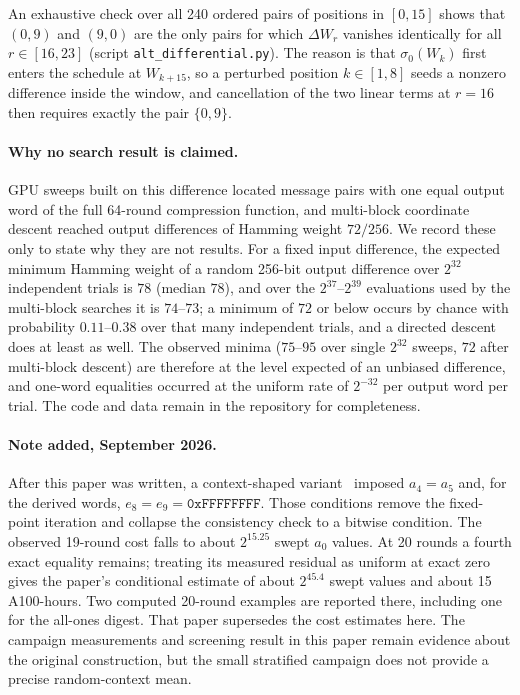 \documentclass[11pt,a4paper]{article}
\begin{document}
An exhaustive check over all 240 ordered pairs of positions in $[0,15]$
shows that $(0,9)$ and $(9,0)$ are the only pairs for which $\Delta W_r$
vanishes identically for all $r\in[16,23]$ (script
\texttt{alt\_differential.py}).  The reason is that $\sigma_0(W_k)$
first enters the schedule at $W_{k+15}$, so a perturbed position
$k\in[1,8]$ seeds a nonzero difference inside the window, and cancellation
of the two linear terms at $r=16$ then requires exactly the pair
$\{0,9\}$.

\paragraph{Why no search result is claimed.}
GPU sweeps built on this difference located message pairs with one equal
output word of the full 64-round compression function, and multi-block
coordinate descent reached output differences of Hamming weight $72/256$.
We record these only to state why they are not results.  For a fixed input
difference, the expected minimum Hamming weight of a random 256-bit output difference over $2^{32}$ independent trials is $78$ (median $78$), and over the $2^{37}$--$2^{39}$ evaluations used by the multi-block searches it is $74$--$73$; a minimum of $72$ or below occurs by chance with probability $0.11$--$0.38$ over that many independent trials, and a directed descent does at least as well.  The
observed minima ($75$--$95$ over single $2^{32}$ sweeps, $72$ after
multi-block descent) are therefore at the level expected of an unbiased
difference, and one-word equalities occurred at the uniform rate of $2^{-32}$ per output word per trial.  The code and data remain in the repository for
completeness.

\paragraph{Note added, September 2026.}  After this paper was written, a
context-shaped variant~\cite{Basra2026Submask} imposed $a_4=a_5$ and, for
the derived words, $e_8=e_9=\mathtt{0xFFFFFFFF}$.  Those conditions remove
the fixed-point iteration and collapse the consistency check to a bitwise
condition.  The observed 19-round cost falls to about $2^{15.25}$ swept
$a_0$ values.  At 20 rounds a fourth exact equality remains; treating its
measured residual as uniform at exact zero gives the paper's conditional
estimate of about $2^{45.4}$ swept values and about 15 A100-hours.  Two
computed 20-round examples are reported there, including one for the
all-ones digest.  That paper supersedes the cost estimates here.  The
campaign measurements and screening result in this paper remain evidence
about the original construction, but the small stratified campaign does not
provide a precise random-context mean.
\end{document}
